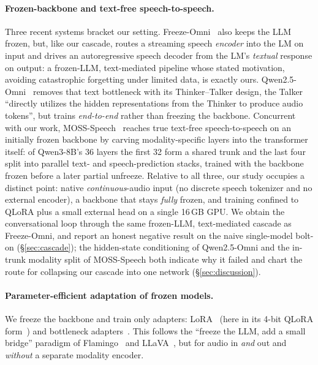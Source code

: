 \documentclass[11pt]{article}
\begin{document}
\paragraph{Frozen-backbone and text-free speech-to-speech.}
Three recent systems bracket our setting. Freeze-Omni~\citep{wang2024freezeomni}
also keeps the LLM frozen, but, like our cascade, routes a streaming speech
\emph{encoder} into the LM on input and drives an autoregressive speech decoder
from the LM's \emph{textual} response on output: a frozen-LLM, text-mediated
pipeline whose stated motivation, avoiding catastrophic forgetting under limited
data, is exactly ours. Qwen2.5-Omni~\citep{xu2025qwen25omni} removes that text
bottleneck with its Thinker--Talker design, the Talker ``directly utilizes the
hidden representations from the Thinker to produce audio tokens'', but trains
\emph{end-to-end} rather than freezing the backbone. Concurrent with our work,
MOSS-Speech~\citep{zhao2025mossspeech} reaches true text-free speech-to-speech on
an initially frozen backbone by carving modality-specific layers into the
transformer itself: of Qwen3-8B's 36 layers the first 32 form a shared trunk and
the last four split into parallel text- and speech-prediction stacks, trained with
the backbone frozen before a later partial unfreeze. Relative to all three, our
study occupies a distinct point: native \emph{continuous}-audio input (no discrete
speech tokenizer and no external encoder), a backbone that stays \emph{fully}
frozen, and training confined to QLoRA plus a small external head on a single
16\,GB GPU. We obtain the conversational loop through the same frozen-LLM,
text-mediated cascade as Freeze-Omni, and report an honest negative result on the
naive single-model bolt-on (\S\ref{sec:cascade}); the hidden-state conditioning of
Qwen2.5-Omni and the in-trunk modality split of MOSS-Speech both indicate why it
failed and chart the route for collapsing our cascade into one network
(\S\ref{sec:discussion}).

\paragraph{Parameter-efficient adaptation of frozen models.}
We freeze the backbone and train only adapters: LoRA~\citep{hu2022lora} (here in
its 4-bit QLoRA form~\citep{dettmers2023qlora}) and bottleneck
adapters~\citep{houlsby2019adapters}. This follows the ``freeze the LLM, add a
small bridge'' paradigm of Flamingo~\citep{alayrac2022flamingo} and
LLaVA~\citep{liu2023llava}, but for audio in \emph{and} out and \emph{without} a
separate modality encoder.
\end{document}
